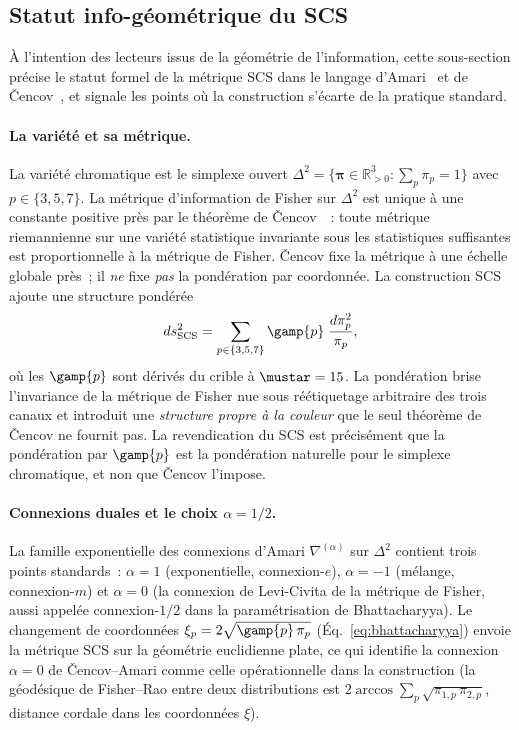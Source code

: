 \documentclass[12pt,a4paper]{article}
\begin{document}
\subsection{Statut info-g\'eom\'etrique du SCS}
\label{sec:infogeo}

\`A l'intention des lecteurs issus de la g\'eom\'etrie de
l'information, cette sous-section pr\'ecise le statut formel de la
m\'etrique SCS dans le langage d'Amari~\cite{amari1985} et de \v{C}encov~\cite{cencov1982}, et signale
les points o\`u la construction s'\'ecarte de la pratique standard.

\paragraph{La vari\'et\'e et sa m\'etrique.}
La vari\'et\'e chromatique est le simplexe ouvert
$\Delta^2 = \{\bm{\pi} \in \mathbb{R}^3_{>0} : \sum_p \pi_p = 1\}$
avec $p \in \{3, 5, 7\}$. La m\'etrique d'information de Fisher sur
$\Delta^2$ est unique \`a une constante positive pr\`es par le
th\'eor\`eme de \v{C}encov~\cite{cencov1982}~: toute m\'etrique
riemannienne sur une vari\'et\'e statistique invariante sous les
statistiques suffisantes est proportionnelle \`a la m\'etrique de
Fisher. \v{C}encov fixe la m\'etrique \`a une \'echelle globale pr\`es~;
il \emph{ne} fixe \emph{pas} la pond\'eration par coordonn\'ee. La
construction SCS ajoute une structure pond\'er\'ee
\begin{equation}
  ds^2_{\mathrm{SCS}}
  = \sum_{p \in \{3,5,7\}} \gamp{p}\;\frac{d\pi_p^2}{\pi_p},
  \label{eq:scs_metric}
\end{equation}
o\`u les $\gamp{p}$ sont d\'eriv\'es du crible \`a $\mustar = 15$. La
pond\'eration brise l'invariance de la m\'etrique de Fisher nue sous
r\'e\'etiquetage arbitraire des trois canaux et introduit une
\emph{structure propre \`a la couleur} que le seul th\'eor\`eme de
\v{C}encov ne fournit pas. La revendication du SCS est pr\'ecis\'ement
que la pond\'eration par $\gamp{p}$ est la pond\'eration naturelle
pour le simplexe chromatique, et non que \v{C}encov l'impose.

\paragraph{Connexions duales et le choix $\alpha = 1/2$.}
La famille exponentielle des connexions d'Amari $\nabla^{(\alpha)}$
sur $\Delta^2$ contient trois points standards~: $\alpha = 1$
(exponentielle, connexion-$e$), $\alpha = -1$ (m\'elange,
connexion-$m$) et $\alpha = 0$ (la connexion de Levi-Civita de la
m\'etrique de Fisher, aussi appel\'ee connexion-$1/2$ dans la
param\'etrisation de Bhattacharyya). Le changement de coordonn\'ees
$\xi_p = 2\sqrt{\gamp{p}\,\pi_p}$ (\'Eq.~\eqref{eq:bhattacharyya})
envoie la m\'etrique SCS sur la g\'eom\'etrie euclidienne plate, ce
qui identifie la connexion $\alpha = 0$ de \v{C}encov--Amari comme
celle op\'erationnelle dans la construction (la g\'eod\'esique de
Fisher--Rao entre deux distributions est
$2 \arccos \sum_p \sqrt{\pi_{1,p}\,\pi_{2,p}}$, distance cordale dans
les coordonn\'ees $\xi$).
\end{document}
